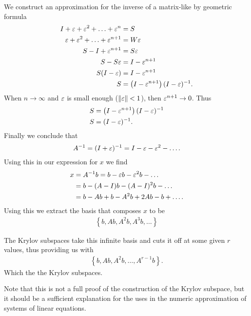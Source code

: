 \documentclass[../fem.tex]{subfile}
\begin{document}
We construct an approximation for the inverse of a matrix-like by geometric
formula
\begin{align*}
  I+{\varepsilon}+{\varepsilon}^2+\ldots+{\varepsilon}^n&=S\\
  {\varepsilon}+{\varepsilon}^2+\ldots+{\varepsilon}^{n+1}&=W{\varepsilon}\\
  S-I+{\varepsilon}^{n+1}&=S{\varepsilon}\\
  S-S{\varepsilon}&=I-{\varepsilon}^{n+1}\\
  S(I-{\varepsilon})&=I-{\varepsilon}^{n+1}\\
  S&=\left(I-{\varepsilon}^{n+1}\right)(I-{\varepsilon})^{-1}.
\end{align*}
When $n\rightarrow\infty$ and ${\varepsilon}$ is small enough ($\Vert{\varepsilon}\Vert<1$), then
${\varepsilon}^{n+1}\rightarrow0$. Thus
\begin{align*}
  S&=\left(I-{\varepsilon}^{n+1}\right)(I-{\varepsilon})^{-1}\\
  S&=(I-{\varepsilon})^{-1}.
\end{align*}
Finally we conclude that
\begin{align*}
  A^{-1}=(I+{\varepsilon})^{-1}=I-{\varepsilon}-{\varepsilon}^2-\ldots.
\end{align*}
Using this in our expression for $x$ we find
\begin{align*}
  x&=A^{-1}b=b-{\varepsilon} b-{\varepsilon}^2b-\ldots\\
   &=b-(A-I)b-(A-I)^2b-\ldots\\
   &=b-Ab+b-A^2b+2Ab-b+\ldots.
\end{align*}
Using this we extract the basis that composes $x$ to be
\begin{align*}
  \left\{b,Ab,A^2b,A^3b,\ldots\right\}
\end{align*}

The Krylov subspaces take this infinite basis and cuts it off at some given
$r$ values, thus providing us with
\begin{align*}
  \left\{b,Ab,A^2b,\ldots,A^{r-1}b\right\}.
\end{align*}
Which the the Krylov subspaces.

Note that this is not a full proof of the construction of the Krylov subspace,
but it should be a sufficient explanation for the uses in the numeric
approximation of systems of linear equations.
\end{document}
